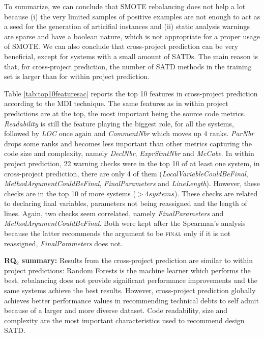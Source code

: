 To summarize, we can conclude that SMOTE rebalancing does not help a lot because (i) the very limited samples of positive examples are not enough to act as a seed for the generation of articifial instances  and (ii) static analysis warnings are sparse and have a boolean nature, which is not appropriate for a proper usage of SMOTE. We can also conclude that cross-project prediction can be very beneficial, except for systems with a small amount of SATDs. The main reason is that, for cross-project prediction, the number of SATD methods in the training set is larger than for within project prediction.



Table \ref{tab:top10featuresac} reports the top 10 features in cross-project prediction according to the MDI technique. The same features as in within project predictions are at the top, the most important being the source code metrics. \textit{Readability} is still the feature playing the biggest role, for all the systems, followed by \textit{LOC} once again and \textit{CommentNbr} which moves up 4 ranks. \textit{ParNbr} drops some ranks and becomes less important than other metrics capturing the code size and complexity, namely \textit{DeclNbr}, \textit{ExprStmtNbr} and \textit{McCabe}. In within project prediction, 22 warning checks were in the top 10 of at least one system, in cross-project prediction, there are only 4 of them (\textit{LocalVariableCouldBeFinal}, \textit{MethodArgumentCouldBeFinal}, \textit{FinalParameters} and \textit{LineLength}). However, these checks are in the top 10 of more systems ($>4 systems$). These checks are related to declaring final variables, parameters not being reassigned and the length of lines. Again, two checks seem correlated, namely \textit{FinalParameters} and \textit{MethodArgumentCouldBeFinal}. Both were kept after the Spearman's analysis because the latter recommends the argument to be \textsc{final} only if it is not reassigned, \textit{FinalParameters} does not.

\begin{mdframed}
	{\bf RQ$_2$ summary:} Results from the cross-project prediction are similar to within project predictions: Random Forests is the machine learner which performs the best, rebalancing does not provide significant performance improvements and the same systems achieve the best results. However, cross-project prediction globally achieves better performance values in recommending technical debts to self admit because of a larger and more diverse dataset. Code readability, size and complexity are the most important characteristics used to recommend design SATD.
\end{mdframed}

